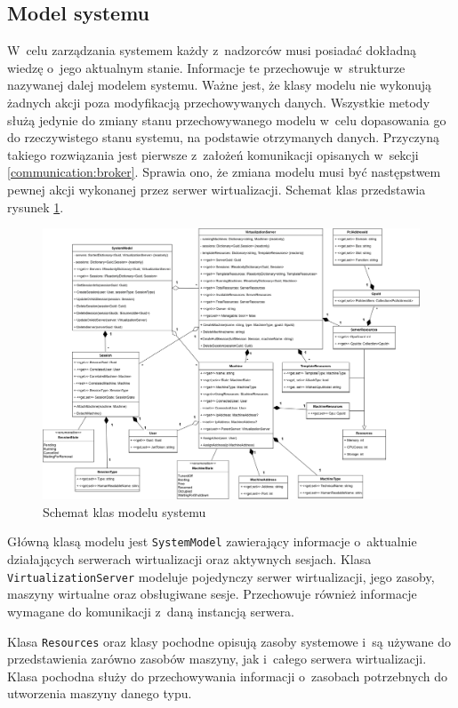 \documentclass[../opis-rozwiazania.tex]{subfiles}
\begin{document}
\subsection{Model systemu}

W~celu zarządzania systemem każdy z~nadzorców musi posiadać dokładną wiedzę o~jego aktualnym stanie. Informacje te przechowuje w~strukturze nazywanej dalej modelem systemu. Ważne jest, że klasy modelu nie wykonują żadnych akcji poza modyfikacją przechowywanych danych. Wszystkie metody służą jedynie do zmiany stanu przechowywanego modelu w~celu dopasowania go do rzeczywistego stanu systemu, na podstawie otrzymanych danych. Przyczyną takiego rozwiązania jest pierwsze z~założeń komunikacji opisanych w~sekcji \ref{communication:broker}. Sprawia ono, że zmiana modelu musi być następstwem pewnej akcji wykonanej przez serwer wirtualizacji. Schemat klas przedstawia rysunek \ref{figure:architecture:model}.

\begin{figure}[ht]
  \centering
  \includegraphics[width=\textwidth]{../diagrams/class_diagrams/system_model_v2.png}
  \caption{Schemat klas modelu systemu}
  \label{figure:architecture:model}
\end{figure}

Główną klasą modelu jest \texttt{SystemModel} zawierający informacje o~aktualnie działających serwerach wirtualizacji oraz aktywnych sesjach. Klasa \texttt{VirtualizationServer} modeluje pojedynczy serwer wirtualizacji, jego zasoby, maszyny wirtualne oraz obsługiwane sesje. Przechowuje również informacje wymagane do komunikacji z~daną instancją serwera.

Klasa \texttt{Resources} oraz klasy pochodne opisują zasoby systemowe i~są używane do przedstawienia zarówno zasobów maszyny, jak i~całego serwera wirtualizacji. Klasa pochodna \texttt{} służy do przechowywania informacji o~zasobach potrzebnych do utworzenia maszyny danego typu.
\end{document}
